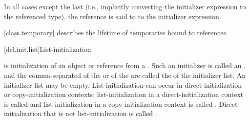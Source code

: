 In all cases except the last
(i.e., implicitly converting the initializer expression
to the referenced type),
the reference is said to  to the
initializer expression.

\pnum
\begin{note}
\ref{class.temporary} describes the lifetime of temporaries bound to references.
\end{note}

[dcl.init.list]{List-initialization}%

\pnum
{} is initialization of an object or reference from a
.
Such an initializer is called an , and
the comma-separated
of the 
or
of the 
are called the  of the initializer list. An initializer list may be empty.
List-initialization can occur in direct-initialization or copy-initialization contexts;
list-initialization in a direct-initialization context is called
 and list-initialization in a
copy-initialization context is called .
Direct-initialization that is not list-initialization is called
.
